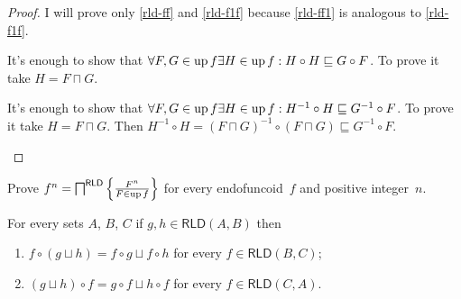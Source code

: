 \begin{proof}
I will prove only \ref{rld-ff} and \ref{rld-f1f} because \ref{rld-ff1}
is analogous to \ref{rld-f1f}.
\begin{widedisorder}
\item [{\ref{rld-ff}}] It's enough to show that $\forall F,G\in\operatorname{up} f\exists H\in\operatorname{up} f:H\circ H\sqsubseteq G\circ F$.
To prove it take $H=F\sqcap G$.
\item [{\ref{rld-f1f}}] It's enough to show that $\forall F,G\in\operatorname{up} f\exists H\in\operatorname{up} f:H^{-1}\circ H\sqsubseteq G^{-1}\circ F$.
To prove it take $H=F\sqcap G$. Then $H^{-1}\circ H=(F\sqcap G)^{-1}\circ(F\sqcap G)\sqsubseteq G^{-1}\circ F$.
\end{widedisorder}
\end{proof}
\begin{xca}\label{rld-fn}
Prove $f^n = \bigsqcap^{\mathsf{RLD}}\left\{ \frac{F^n}{F\in\operatorname{up} f}\right\}$ for every endofuncoid~$f$ and positive integer~$n$.
\end{xca}
\begin{thm}
For every sets $A$, $B$, $C$ if $g,h\in\mathsf{RLD}(A,B)$ then
\begin{enumerate}
\item $f\circ(g\sqcup h)=f\circ g\sqcup f\circ h$ for every $f\in\mathsf{RLD}(B,C)$;
\item $(g\sqcup h)\circ f=g\circ f\sqcup h\circ f$ for every $f\in\mathsf{RLD}(C,A)$.
\end{enumerate}
\end{thm}
